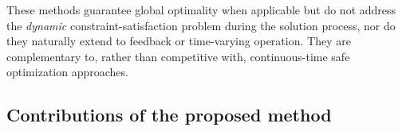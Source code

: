 \documentclass[11pt,onecolumn]{article}
\theoremstyle{definition}
\theoremstyle{remark}
\begin{document}
These methods guarantee global optimality when applicable but do not address the \emph{dynamic} constraint-satisfaction problem during the solution process, nor do they naturally extend to feedback or time-varying operation. They are complementary to, rather than competitive with, continuous-time safe optimization approaches.

\subsection{Contributions of the proposed method}

\end{document}
